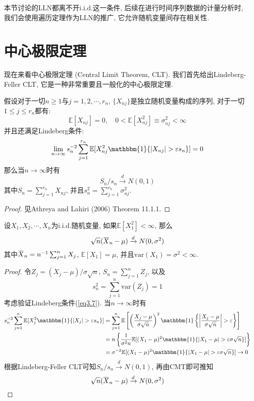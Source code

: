 \documentclass[cn, 12pt, math=mtpro2, bibstyle=apa, blue, twocol]{elegantbook}
\newcommand{\E}{\mathbb{E}}
\newcommand{\limn}{\lim_{n\to\infty}}
\newcommand{\overbar}[1]{\mkern 1.5mu\overline{\mkern-1.5mu#1\mkern-1.5mu}\mkern 1.5mu}
\begin{document}
本节讨论的LLN都离不开i.i.d.这一条件, 后续在进行时间序列数据的计量分析时, 我们会使用遍历定理作为LLN的推广, 它允许随机变量间存在相关性.

\section{中心极限定理}
现在来看中心极限定理 (Central Limit Theorem, CLT). 我们首先给出Lindeberg-Feller CLT, 它是一种非常重要且一般化的中心极限定理.
\begin{theorem}
    假设对于一切$n\ge1$与$j=1,2,\cdots,r_n$, $\{X_{nj}\}$是独立随机变量构成的序列, 对于一切$1\leq j\leq r_n$都有:
    $$\E[X_{nj}]=0,\quad 0<\E[X_{nj}^2]\equiv\sigma_{nj}^2<\infty$$
    并且还满足Lindeberg条件:
    \begin{equation}\label{eq3.7}
      \limn s_n^{-2}\sum_{j=1}^{r_n}\E[X_{nj}^2\mathbbm{1}\{|X_{nj}|>\varepsilon s_n\}]=0
    \end{equation}
    那么当$n\to\infty$时有
    $$S_n/s_n\xrightarrow{d}N(0,1)$$
    其中$S_n=\sum_{j=1}^{r_n}X_{nj}$, 并且$s_n^2=\sum_{j=1}^{r_n}\sigma_{nj}^2$.
\end{theorem}
\begin{proof}
  见Athreya and Lahiri (2006) Theorem 11.1.1.
\end{proof}
\begin{corollary}
设$X_1,X_2,\cdots,X_n$为i.i.d.随机变量, 如果$\E[X_1^2]<\infty$, 那么
      $$\sqrt{n}(\overbar{X}_n-\mu)\xrightarrow{d}N(0,\sigma^2)$$
      其中$\overbar{X}_n=n^{-1}\sum_{j=1}^{n}X_j$, $\E[X_1]=\mu$, 并且$\text{var}(X_1)=\sigma^2<\infty$.
\end{corollary}
\begin{proof}
  令$\displaystyle Z_j=(X_j-\mu)/\sigma\sqrt{n}$, $S_n=\sum_{j=1}^{n}Z_j$, 以及
  $$s_n^2=\sum_{j=1}^{n}\text{var}(Z_j)=1$$
  考虑验证Lindeberg条件(\ref{eq3.7}). 当$n\to\infty$时有
      \begin{align*}
      s_n^{-2}\sum_{j=1}^{n}\E[X_j^2\mathbbm{1}\{|X_j|>\varepsilon s_n\}]&=\sum_{j=1}^{n}\E\left[\left(\frac{X_j-\mu}{\sigma\sqrt{n}}\right)^2\mathbbm{1}\left\{\left|\frac{X_j-\mu}{\sigma\sqrt{n}}\right|>\varepsilon\right\} \right]\\
      &=n\left\{\frac{1}{\sigma^2n}\E[(X_1-\mu)^2\mathbbm{1}\{|X_1-\mu|>\varepsilon\sigma\sqrt{n}\}]\right\} \\
      &=\sigma^{-2}\E[(X_1-\mu)^2\mathbbm{1}\{|X_1-\mu|>\varepsilon\sigma\sqrt{n}\}]\to0
      \end{align*}
      根据Lindeberg-Feller CLT可知$S_n/s_n\xrightarrow{d}N(0,1)$, 再由CMT即可推知
      $$\sqrt{n}(\overbar{X} _n-\mu)\xrightarrow{d}N(0,\sigma^2)$$
\end{proof}
\end{document}

